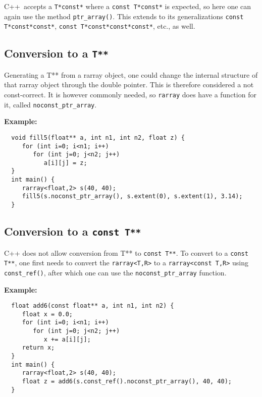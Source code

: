 \documentclass[11pt,twoside]{article}
\newcommand{\cxx}{C{++}}
\begin{document}
\noindent
\cxx\ accepts a \texttt{T*const*} where a \texttt{const T*const*} is expected, so here one can again use the method \texttt{ptr\_array()}.
This extends to its generalizations \texttt{const T*const*const*}, \texttt{const T*const*const*const*}, etc., as well.


\subsection{Conversion to a {\tt T**}}

\noindent
Generating a T** from a rarray object, one could change the internal structure of that rarray object through the double pointer.  This is therefore considered a not const-correct.  It is however commonly needed, so \texttt{rarray} does have a function for it, called \texttt{noconst\_ptr\_array}. 

\noindent
{\bf Example:}
\vspace{-5pt}\begin{framed}\vspace{-14pt}%
\begin{verbatim}
  void fill5(float** a, int n1, int n2, float z) {
     for (int i=0; i<n1; i++)
        for (int j=0; j<n2; j++)
           a[i][j] = z;
  }
  int main() {
     rarray<float,2> s(40, 40);
     fill5(s.noconst_ptr_array(), s.extent(0), s.extent(1), 3.14);
  }
\end{verbatim}%
\vspace{-14pt}
\end{framed}

\subsection{Conversion to a {\tt const T**}}
\noindent
C++ does not allow conversion from T** to \texttt{const T**}. To convert to a \texttt{const T**}, one first needs to convert the \texttt{rarray{\tt<}T,R{\tt>}} to a \texttt{rarray{\tt<}const T,R{\tt>}} using \texttt{const\_ref()}, after which one can use the \texttt{noconst\_ptr\_array} function.

\noindent
{\bf Example:}
\vspace{-5pt}\begin{framed}\vspace{-14pt}%
\begin{verbatim}
  float add6(const float** a, int n1, int n2) {
     float x = 0.0;
     for (int i=0; i<n1; i++)
        for (int j=0; j<n2; j++)
           x += a[i][j];
     return x;
  }
  int main() {
     rarray<float,2> s(40, 40);
     float z = add6(s.const_ref().noconst_ptr_array(), 40, 40);
  }
\end{verbatim}%
\vspace{-14pt}
\end{framed}
\end{document}
